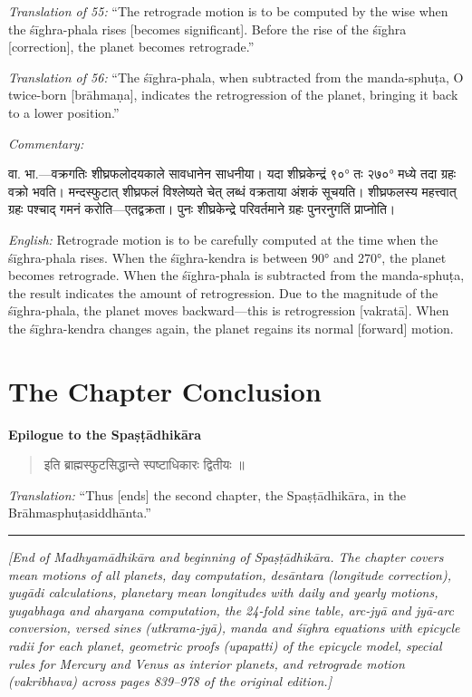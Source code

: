 \documentclass[11pt,a4paper]{book}
\newcommand{\dev}[1]{{\devanagarifont #1}}
\newenvironment{shloka}{%
  \begin{verse}
  \devanagarifont\color{versecolor}%
}{\end{verse}}
\newenvironment{vasaanaskt}{%
  \par\vspace{0.5em}\noindent\small\textit{Commentary:}%
}{\par\vspace{0.5em}}
\newcommand{\ruleheading}[1]{%
  \par\vspace{0.8em}\noindent\textbf{\color{sectioncolor}#1}\par\vspace{0.3em}%
}
\begin{document}
\textit{Translation of 55:} ``The retrograde motion is to be computed by the wise when the śīghra-phala rises [becomes significant]. Before the rise of the śīghra [correction], the planet becomes retrograde.''

\textit{Translation of 56:} ``The śīghra-phala, when subtracted from the manda-sphuṭa, O twice-born [brāhmaṇa], indicates the retrogression of the planet, bringing it back to a lower position.''

\begin{vasaanaskt}
\dev{वा. भा.}---वक्रगतिः शीघ्रफलोदयकाले सावधानेन साधनीया। यदा शीघ्रकेन्द्रं ९०° तः २७०° मध्ये तदा ग्रहः वक्रो भवति। मन्दस्फुटात् शीघ्रफलं विश्लेष्यते चेत् लब्धं वक्रताया अंशकं सूचयति। शीघ्रफलस्य महत्त्वात् ग्रहः पश्चाद् गमनं करोति---एतद्वक्रता। पुनः शीघ्रकेन्द्रे परिवर्तमाने ग्रहः पुनरनुगतिं प्राप्नोति।

\textit{English:} Retrograde motion is to be carefully computed at the time when the śīghra-phala rises. When the śīghra-kendra is between 90° and 270°, the planet becomes retrograde. When the śīghra-phala is subtracted from the manda-sphuṭa, the result indicates the amount of retrogression. Due to the magnitude of the śīghra-phala, the planet moves backward---this is retrogression [vakratā]. When the śīghra-kendra changes again, the planet regains its normal [forward] motion.
\end{vasaanaskt}

\section{The Chapter Conclusion}

\ruleheading{Epilogue to the Spaṣṭādhikāra}

\begin{shloka}
\begin{altverse}
\dev{इति ब्राह्मस्फुटसिद्धान्ते स्पष्टाधिकारः द्वितीयः ॥}
\end{altverse}
\end{shloka}

\textit{Translation:} ``Thus [ends] the second chapter, the Spaṣṭādhikāra, in the Brāhmasphuṭasiddhānta.''

\begin{center}
\rule{0.5\textwidth}{0.8pt}
\end{center}

\noindent
\textit{[End of Madhyamādhikāra and beginning of Spaṣṭādhikāra. The chapter covers mean motions of all planets, day computation, desāntara (longitude correction), yugādi calculations, planetary mean longitudes with daily and yearly motions, yugabhaga and ahargana computation, the 24-fold sine table, arc-jyā and jyā-arc conversion, versed sines (utkrama-jyā), manda and śīghra equations with epicycle radii for each planet, geometric proofs (upapatti) of the epicycle model, special rules for Mercury and Venus as interior planets, and retrograde motion (vakribhava) across pages 839--978 of the original edition.]}
\end{document}

